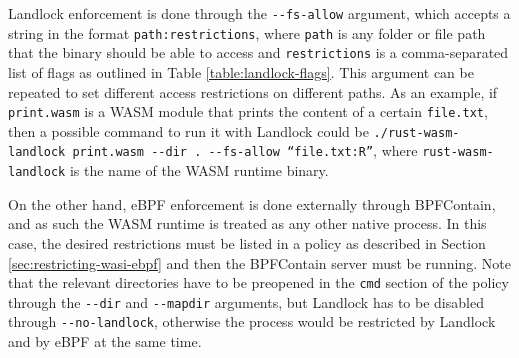 Landlock enforcement is done through the \texttt{-{}-fs-allow} argument, which accepts a string in the format
\texttt{path:restrictions}, where \texttt{path} is any folder or file path that the binary should be able to access
and \texttt{restrictions} is a comma-separated list of flags as outlined in Table \ref{table:landlock-flags}.
This argument can be repeated to set different access restrictions on different paths.
As an example, if \texttt{print.wasm} is a WASM module that prints the content of a certain \texttt{file.txt},
then a possible command to run it with Landlock could be \texttt{./rust-wasm-landlock print.wasm -{}-dir . -{}-fs-allow ``file.txt:R''},
where \texttt{rust-wasm-landlock} is the name of the WASM runtime binary.

On the other hand, eBPF enforcement is done externally through BPFContain, and as such the WASM runtime is treated
as any other native process. In this case, the desired restrictions must be listed in a policy as described in
Section \ref{sec:restricting-wasi-ebpf} and then the BPFContain server must be running.
Note that the relevant directories have to be preopened in the \texttt{cmd} section of the policy
through the \texttt{-{}-dir} and \texttt{-{}-mapdir} arguments, but Landlock has to be
disabled through \texttt{-{}-no-landlock}, otherwise the process would be restricted by
Landlock and by eBPF at the same time.